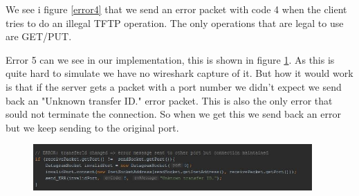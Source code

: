 \documentclass[a4paper,12pt]{article}
\numberwithin{figure}{section}
\begin{document}
\noindent We see i figure \ref{error4} that we send an error packet with code 4 when the client tries to do an illegal TFTP operation. The only operations that are legal to use are GET/PUT. 

\noindent Error 5 can we see in our implementation, this is shown in figure \ref{error 5}. As this is quite hard to simulate we have no wireshark capture of it. But how it would work is that if the server gets a packet with a port number we didn't expect we send back an "Unknown transfer ID."\cite{RFC1350} error packet. This is also the only error that sould not terminate the connection. So when we get this we send back an error but we keep sending to the original port.   

\begin{figure}[h!]
	\centering
	\includegraphics[width=0.95\textwidth,keepaspectratio]{img/error5.jpg} 
	\caption{}
	\label{error 5}
\end{figure}

\newpage


\end{document}
